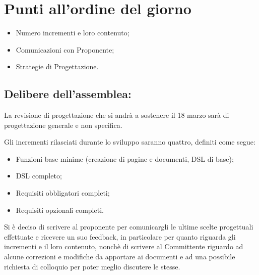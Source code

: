 \newpage
\section{Punti all'ordine del giorno}
\label{2}

\begin{itemize}
\item Numero incrementi e loro contenuto;
\item Comunicazioni con Proponente;
\item Strategie di Progettazione.
\end{itemize}


\subsection{Delibere dell’assemblea:}
La revisione di progettazione che si andrà a sostenere il 18 marzo sarà di progettazione generale e non specifica.

Gli incrementi rilasciati durante lo sviluppo saranno quattro, definiti come segue:

\begin{itemize}
\item Funzioni base minime (creazione di pagine e documenti, DSL di base);
\item DSL completo;
\item Requisiti obbligatori completi;
\item Requisiti opzionali completi.
\end{itemize}

Si è deciso di scrivere al proponente per comunicargli  le ultime scelte progettuali effettuate e ricevere un suo feedback, in particolare per quanto riguarda gli incrementi e il loro contenuto, nonchè di scrivere al Committente riguardo ad alcune correzioni e modifiche da apportare ai documenti  e ad una possibile richiesta di colloquio per poter meglio discutere le stesse.



